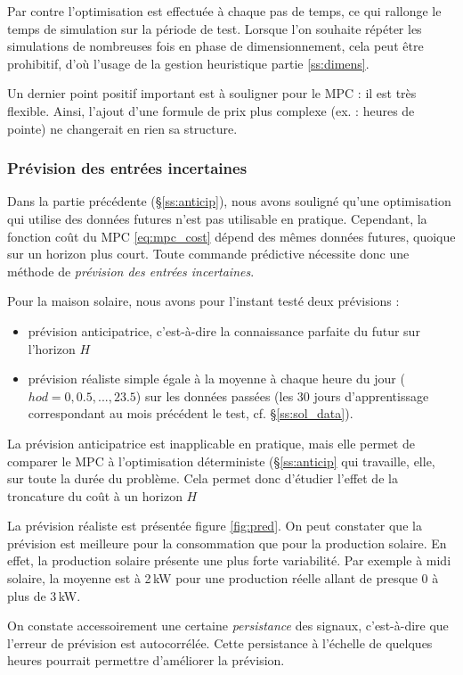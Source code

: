 \documentclass[a4paper,10pt,twocolumn]{article}
\begin{document}
Par contre l'optimisation est effectuée à chaque pas de temps,
ce qui rallonge le temps de simulation sur la période de test.
Lorsque l'on souhaite répéter les simulations de nombreuses fois en phase
de dimensionnement, cela peut être prohibitif,
d'où l'usage de la gestion heuristique partie \ref{ss:dimens}.

Un dernier point positif important est à souligner pour le MPC :
il est très flexible.
Ainsi, l'ajout d'une formule de prix plus complexe (ex. : heures de pointe)
ne changerait en rien sa structure.

\subsubsection{Prévision des entrées incertaines}

Dans la partie précédente (§\ref{ss:anticip}), nous avons souligné
qu'une optimisation qui utilise des données futures n'est pas utilisable
en pratique. Cependant, la fonction coût du MPC \eqref{eq:mpc_cost} dépend des
mêmes données futures, quoique sur un horizon plus court.
Toute commande prédictive nécessite donc une méthode de \emph{prévision des entrées incertaines}.

Pour la maison solaire, nous avons pour l'instant testé deux prévisions :
\begin{itemize}
 \item prévision anticipatrice, c'est-à-dire la connaissance parfaite du futur sur l'horizon $H$
 \item prévision réaliste simple égale à la moyenne à chaque heure du jour
 ($hod = 0, 0.5, ..., 23.5$) sur les données passées
 (les 30 jours d'apprentissage correspondant au mois précédent le test, cf. §\ref{ss:sol_data}).
\end{itemize}

La prévision anticipatrice est inapplicable en pratique, mais elle permet
de comparer le MPC à l'optimisation déterministe (§\ref{ss:anticip} qui travaille,
elle, sur toute la durée du problème.
Cela permet donc d'étudier l'effet de la troncature du coût  à un horizon $H$

La prévision réaliste est présentée figure \ref{fig:pred}.
On peut constater que la prévision est meilleure pour la consommation
que pour la production solaire. En effet, la production solaire présente
une plus forte variabilité. Par exemple à midi solaire, la moyenne est à 2\,kW
pour une production réelle allant de presque 0 à plus de 3\,kW.

On constate accessoirement une certaine \emph{persistance} des signaux,
c'est-à-dire que l'erreur de prévision est autocorrélée.
Cette persistance à l'échelle de quelques heures pourrait permettre
d'améliorer la prévision.
\end{document}
